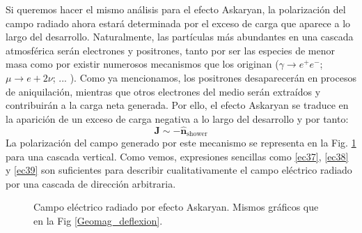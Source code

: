 \documentclass[12 pt, a4paper]{article} %
\numberwithin{equation}{section}
\numberwithin{figure}{section}
\newcommand{\vect}[1]{\boldsymbol{\mathbf{#1}}}
\begin{document}
Si queremos hacer el mismo análisis para el efecto Askaryan, la polarización del campo radiado ahora estará determinada por el exceso de carga que aparece a lo largo del desarrollo. Naturalmente, las partículas más abundantes en una cascada atmosférica serán electrones y positrones, tanto por ser las especies de menor masa como por existir numerosos mecanismos que los originan ($\gamma\rightarrow e^+e^-$; $\mu \rightarrow e+2\nu$; ... ). Como ya mencionamos, los positrones desaparecerán en procesos de aniquilación, mientras que otros electrones del medio serán extraídos y contribuirán a la carga neta generada. Por ello, el efecto Askaryan se traduce en la aparición de un exceso de carga negativa a lo largo del desarrollo y por tanto:
\begin{equation}
	\vect{J}\sim -\hat{\vect{n}}_{\text{shower}}\label{ec39}
\end{equation}
La polarización del campo generado por este mecanismo se representa en la Fig. \ref{Askaryan} para una cascada vertical. Como vemos, expresiones sencillas como \eqref{ec37}, \eqref{ec38} y \eqref{ec39} son suficientes para describir cualitativamente el campo eléctrico radiado por una cascada de dirección arbitraria.
\begin{figure}[H]
	\centering
	\hspace{10mm}
	\caption{Campo eléctrico radiado por efecto Askaryan. Mismos gráficos que en la Fig \ref{Geomag_deflexion}.}
	\label{Askaryan}
\end{figure}
\end{document}
